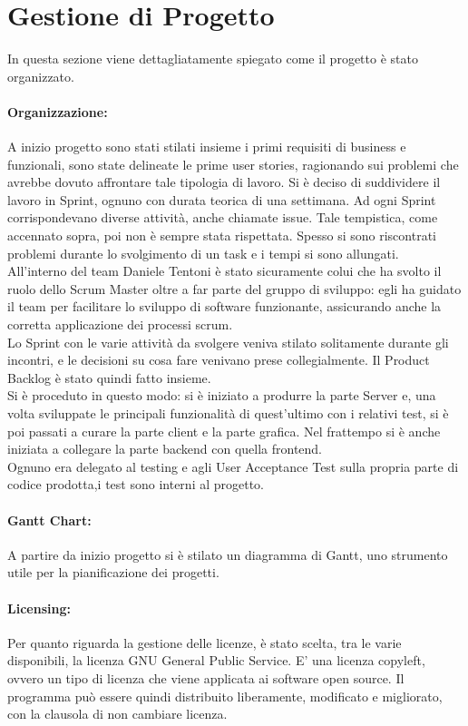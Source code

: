 \section{Gestione di Progetto}
In questa sezione viene dettagliatamente spiegato come il progetto è stato organizzato. 
    \paragraph{Organizzazione: }
    A inizio progetto sono stati stilati insieme i primi requisiti di business e funzionali, sono state delineate le prime user stories, ragionando sui problemi che avrebbe dovuto affrontare tale tipologia di lavoro.
   Si è deciso di suddividere il lavoro in Sprint, ognuno con durata teorica di una settimana. Ad ogni Sprint corrispondevano diverse attività, anche chiamate issue. Tale tempistica, come accennato sopra, poi non è sempre stata rispettata. Spesso si sono riscontrati problemi durante lo svolgimento di un task e i tempi si sono allungati.\\
    All'interno del team Daniele Tentoni è stato sicuramente colui che ha svolto il ruolo dello Scrum Master oltre a far parte del gruppo di sviluppo: egli ha guidato il team per facilitare lo sviluppo di software funzionante, assicurando anche la corretta applicazione dei processi scrum.\\
    Lo Sprint con le varie attività da svolgere veniva stilato solitamente durante gli incontri, e le decisioni su cosa fare venivano prese collegialmente. Il Product Backlog è stato quindi fatto insieme.\\ 
    Si è proceduto in questo modo: si è iniziato a produrre la parte Server e, una volta sviluppate le principali funzionalità di quest'ultimo con i relativi test, si è poi passati a curare la parte client e la parte grafica. Nel frattempo si è anche iniziata a collegare la parte backend con quella frontend.\\
    Ognuno era delegato al testing e agli User Acceptance Test sulla propria parte di codice prodotta,i test sono interni al progetto. 
    
    
    
    \paragraph{Gantt Chart: } 
    A partire da inizio progetto si è stilato un diagramma di Gantt, uno strumento utile per la pianificazione dei progetti.
    
    \paragraph{Licensing: } Per quanto riguarda la gestione delle licenze, è stato scelta, tra le varie disponibili, la licenza GNU General Public Service. E' una licenza copyleft, ovvero un tipo di licenza che viene applicata ai software open source. Il programma può essere quindi distribuito liberamente, modificato e migliorato, con la clausola di non cambiare licenza.
    
